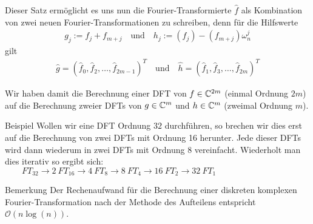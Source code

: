 
Dieser Satz ermöglicht es uns nun die Fourier-Transformierte $\hat{f}$ als Kombination von zwei neuen 
Fourier-Transformationen zu schreiben, denn für die Hilfswerte
%
\begin{align*}
  g_{j} := f_j + f_{m+j} 
  \quad \text{und}\quad 
  h_{j} := (f_j) - (f_{m+j})\omega_n^j
\end{align*}
%
gilt 
\begin{align*}
  \hat{g} = (\hat{f}_0,\hat{f}_2,\dots,\hat{f}_{2m-1})^T 
  \quad\text{und}\quad 
  \hat{h} = (\hat{f}_1,\hat{f}_3,\dots,\hat{f}_{2m})^T 
\end{align*}

Wir haben damit die Berechnung einer DFT von $f\in\mathbb C^{2m}$ (einmal Ordnung $2m$) auf die Berechnung zweier DFTs von 
$g\in\mathbb C^m$ und $h\in\mathbb C^m$ (zweimal Ordnung $m$). 

\begin{colbox}{Beispiel}
  Wollen wir eine DFT Ordnung $32$ durchführen, so brechen wir dies erst auf die Berechnung von zwei DFTs mit Ordnung 
  16 herunter. Jede dieser DFTs wird dann wiederum in zwei DFTs mit Ordnung 8 vereinfacht. Wiederholt man dies iterativ 
  so ergibt sich:\\
  $
  \qquad FT_{32} 
  \rightarrow 2\ FT_{16} 
  \rightarrow 4\ FT_{8} 
  \rightarrow 8\ FT_{4} 
  \rightarrow 16\ FT_{2} 
  \rightarrow 32\ FT_{1}
  $
\end{colbox}

\begin{colbox}{Bemerkung}
  Der Rechenaufwand für die Berechnung einer diskreten komplexen Fourier-Transformation nach der Methode des Aufteilens
  entspricht $\mathcal{O}(n\log(n))$.
\end{colbox}

